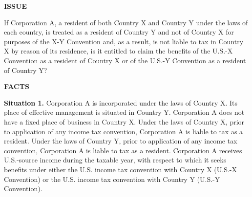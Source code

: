 \begin{select}
\begin{center}\textbf{ISSUE}
\end{center} 
If Corporation A, a resident of both Country X and Country Y under the laws of each country, is 
treated as a resident of Country Y and not of Country X for purposes of the X-Y Convention and, as 
a result, is not liable to tax in Country X by reason of its residence, is it entitled to claim the benefits of the U.S.-X Convention as a resident of Country X or of the U.S.-Y Convention as a resident of Country Y? 
\begin{center}\textbf{FACTS}
\end{center}
\textbf{Situation 1.} Corporation A is incorporated under the laws of Country X. Its place of effective management is situated in Country Y. Corporation A does not have a fixed place of business in Country X. Under the laws of Country X, prior to application of any income tax convention, Corporation A is liable to tax as a resident. Under the laws of Country Y, prior to application of any income tax convention, Corporation A is liable to tax as a resident. Corporation A receives U.S.-source income during the taxable year, with respect to which it seeks benefits under either the U.S. income tax convention with Country X (U.S.-X Convention) or the U.S. income tax convention with Country Y (U.S.-Y Convention). 


\end{select}
